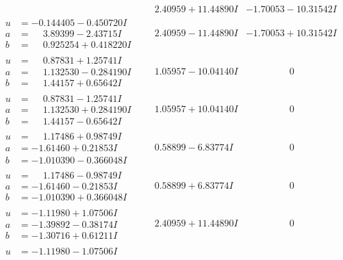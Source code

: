 \documentclass[1p]{elsarticle_modified}
\theoremstyle{definition}
\begin{document}
$$\begin{array}{c|c|c}
 & \phantom{-}2.40959 + 11.44890 I & -1.70053 - 10.31542 I \\ \hline\begin{aligned}
u &= -0.144405 - 0.450720 I \\
a &= \phantom{-}3.89399 - 2.43715 I \\
b &= \phantom{-}0.925254 + 0.418220 I\end{aligned}
 & \phantom{-}2.40959 - 11.44890 I & -1.70053 + 10.31542 I \\ \hline\begin{aligned}
u &= \phantom{-}0.87831 + 1.25741 I \\
a &= \phantom{-}1.132530 - 0.284190 I \\
b &= \phantom{-}1.44157 + 0.65642 I\end{aligned}
 & \phantom{-}1.05957 - 10.04140 I & \phantom{-0.000000 } 0 \\ \hline\begin{aligned}
u &= \phantom{-}0.87831 - 1.25741 I \\
a &= \phantom{-}1.132530 + 0.284190 I \\
b &= \phantom{-}1.44157 - 0.65642 I\end{aligned}
 & \phantom{-}1.05957 + 10.04140 I & \phantom{-0.000000 } 0 \\ \hline\begin{aligned}
u &= \phantom{-}1.17486 + 0.98749 I \\
a &= -1.61460 + 0.21853 I \\
b &= -1.010390 - 0.366048 I\end{aligned}
 & \phantom{-}0.58899 - 6.83774 I & \phantom{-0.000000 } 0 \\ \hline\begin{aligned}
u &= \phantom{-}1.17486 - 0.98749 I \\
a &= -1.61460 - 0.21853 I \\
b &= -1.010390 + 0.366048 I\end{aligned}
 & \phantom{-}0.58899 + 6.83774 I & \phantom{-0.000000 } 0 \\ \hline\begin{aligned}
u &= -1.11980 + 1.07506 I \\
a &= -1.39892 - 0.38174 I \\
b &= -1.30716 + 0.61211 I\end{aligned}
 & \phantom{-}2.40959 + 11.44890 I & \phantom{-0.000000 } 0 \\ \hline\begin{aligned}
u &= -1.11980 - 1.07506 I \\

\end{aligned}
\end{array}$$
\end{document}
